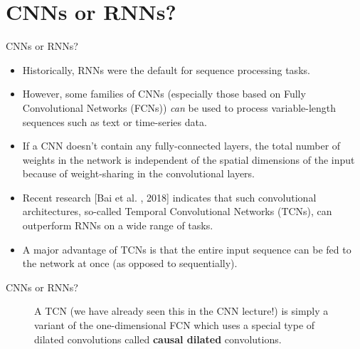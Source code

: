 
\section{CNNs or RNNs?}

\begin{frame} {CNNs or RNNs?}
  \begin{itemize}
    \item Historically, RNNs were the default for sequence processing tasks.
    \item However, some families of CNNs (especially those based on Fully Convolutional Networks (FCNs)) \textit{can} be used to process variable-length sequences such as text or time-series data.
    \item If a CNN doesn't contain any fully-connected layers, the total number of weights in the network is independent of the spatial dimensions of the input because of weight-sharing in the convolutional layers.
    \item Recent research [Bai et al. , 2018] indicates that such convolutional architectures, so-called Temporal Convolutional Networks (TCNs), can outperform RNNs on a wide range of tasks.
    \item A major advantage of TCNs is that the entire input sequence can be fed to the network at once (as opposed to sequentially).
  \end{itemize}
\end{frame}

\begin{frame} {CNNs or RNNs?}
  \begin{figure}
      \centering
      \caption{\footnotesize{A TCN (we have already seen this in the CNN lecture!) is simply a variant of the one-dimensional FCN which uses a special type of dilated convolutions called \textbf{causal dilated} convolutions.}}
  \end{figure}
\end{frame}


